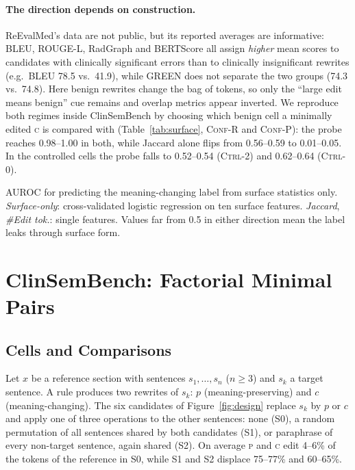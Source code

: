 \documentclass[11pt]{article}
\newcommand{\bench}{ClinSemBench\xspace}
\newcommand{\Pc}{\textsc{p}\xspace}
\newcommand{\Cc}{\textsc{c}\xspace}
\newcommand{\ctrlz}{\textsc{Ctrl-0}\xspace}
\newcommand{\ctrlt}{\textsc{Ctrl-2}\xspace}
\newcommand{\confr}{\textsc{Conf-R}\xspace}
\newcommand{\confp}{\textsc{Conf-P}\xspace}
\begin{document}
\paragraph{The direction depends on construction.}
ReEvalMed's data are not public, but its reported averages are informative: BLEU, ROUGE-L, RadGraph and BERTScore all assign \emph{higher} mean scores to candidates with clinically significant errors than to clinically insignificant rewrites (e.g.\ BLEU 78.5 vs.\ 41.9), while GREEN does not separate the two groups (74.3 vs.\ 74.8).
Here benign rewrites change the bag of tokens, so only the ``large edit means benign'' cue remains and overlap metrics appear inverted.
We reproduce both regimes inside \bench by choosing which benign cell a minimally edited \Cc is compared with (Table~\ref{tab:surface}, \confr and \confp): the probe reaches 0.98--1.00 in both, while Jaccard alone flips from 0.56--0.59 to 0.01--0.05.
In the controlled cells the probe falls to 0.52--0.54 (\ctrlt) and 0.62--0.64 (\ctrlz).

\begin{table}[t]
\centering
\scriptsize
\setlength{\tabcolsep}{2.5pt}
\begin{adjustbox}{max width=\columnwidth}

\end{adjustbox}
\caption{AUROC for predicting the meaning-changing label from surface statistics only. \emph{Surface-only}: cross-validated logistic regression on ten surface features. \emph{Jaccard}, \emph{\#Edit tok.}: single features. Values far from 0.5 in either direction mean the label leaks through surface form.}
\label{tab:surface}
\end{table}

\section{\bench: Factorial Minimal Pairs}
\label{sec:design}

\subsection{Cells and Comparisons}

Let $x$ be a reference section with sentences $s_1,\dots,s_n$ ($n\ge3$) and $s_k$ a target sentence. A rule produces two rewrites of $s_k$: $p$ (meaning-preserving) and $c$ (meaning-changing). The six candidates of Figure~\ref{fig:design} replace $s_k$ by $p$ or $c$ and apply one of three operations to the other sentences: none (S0), a random permutation of all sentences shared by both candidates (S1), or paraphrase of every non-target sentence, again shared (S2). On average \Pc and \Cc edit 4--6\% of the tokens of the reference in S0, while S1 and S2 displace 75--77\% and 60--65\%.
\end{document}
